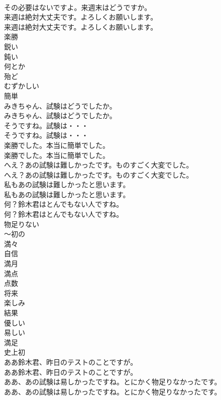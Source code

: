\documentclass[8pt]{extreport}
\begin{document}
\begin{CJK}{UTF8}{min}
\\	その必要はないですよ。来週末はどうですか。 
\\	来週は絶対大丈夫です。よろしくお願いします。	
\\	来週は絶対大丈夫です。よろしくお願いします。 
\\	楽勝
\\	鋭い
\\	鈍い
\\	何とか
\\	殆ど
\\	むずかしい
\\	簡単
\\	みきちゃん、試験はどうでしたか。	
\\	みきちゃん、試験はどうでしたか。 
\\	そうですね。試験は・・・	
\\	そうですね。試験は・・・ 
\\	楽勝でした。本当に簡単でした。	
\\	楽勝でした。本当に簡単でした。 
\\	へえ？あの試験は難しかったです。ものすごく大変でした。	
\\	へえ？あの試験は難しかったです。ものすごく大変でした。 
\\	私もあの試験は難しかったと思います。	
\\	私もあの試験は難しかったと思います。 
\\	何？鈴木君はとんでもない人ですね。	
\\	何？鈴木君はとんでもない人ですね。 
\\	物足りない
\\	〜初の
\\	満々
\\	自信
\\	満月
\\	満点
\\	点数
\\	将来
\\	楽しみ
\\	結果
\\	優しい
\\	易しい
\\	満足
\\	史上初
\\	ああ鈴木君、昨日のテストのことですが。	
\\	ああ鈴木君、昨日のテストのことですが。 
\\	ああ、あの試験は易しかったですね。とにかく物足りなかったです。	
\\	ああ、あの試験は易しかったですね。とにかく物足りなかったです。 

\end{CJK}
\end{document}
